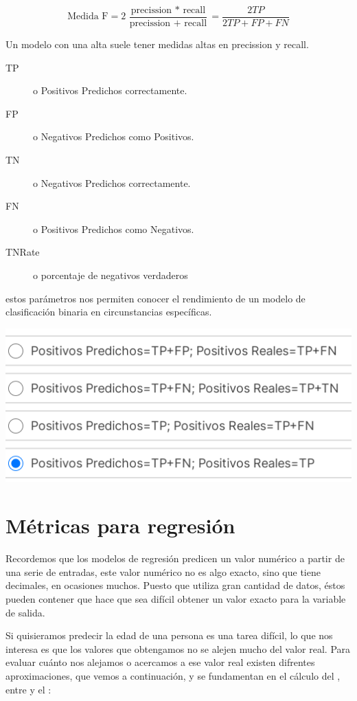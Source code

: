 $$\text{Medida F} = 2\,\frac{\text{precission }\ast \text{ recall}}{\text{precission }+ \text{ recall}} = \frac{2TP}{2TP + FP + FN}$$

Un modelo con una  alta suele tener medidas altas en precission y recall.

\begin{description}
    \item[TP] o Positivos Predichos correctamente.
    \item[FP]  o Negativos Predichos como Positivos.
    \item[TN] o Negativos Predichos correctamente. 
    \item[FN] o Positivos Predichos como Negativos.  
    \item[TNRate] o porcentaje de negativos verdaderos 
\end{description}
estos parámetros nos permiten conocer el rendimiento de un modelo de clasificación binaria en circunstancias específicas.
\begin{center}
    \includegraphics[scale=.65]{images/mod02-02.png}
\end{center}


\section{Métricas para regresión}

Recordemos que los modelos de regresión predicen un valor numérico a partir de una serie de entradas, este valor numérico no es algo exacto, sino que tiene decimales, en ocasiones muchos. Puesto que utiliza gran cantidad de datos, éstos pueden contener  que hace que sea difícil obtener un valor exacto para la variable de salida.

Si quisieramos predecir la edad de una persona es una tarea difícil, lo que nos interesa es que los valores que obtengamos no se alejen mucho del valor real. Para evaluar cuánto nos alejamos o acercamos a ese valor real existen difrentes aproximaciones, que vemos a continuación, y se fundamentan en el cálculo del , entre  y el :

